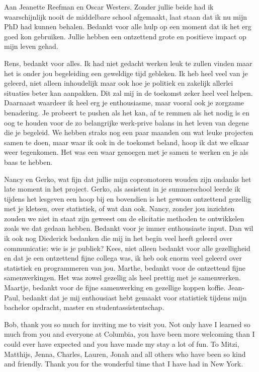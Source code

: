 \documentclass[openright,titlepage,12pt,a4paper]{book}
\begin{document}
Aan Jeanette Reefman en Oscar Westers. Zonder jullie beide had ik waarschijnlijk nooit de middelbare school afgemaakt, laat staan dat ik nu mijn PhD had kunnen behalen. Bedankt voor alle hulp op een moment dat ik het erg goed kon gebruiken. Jullie hebben een ontzettend grote en positieve impact op mijn leven gehad.

Rens, bedankt voor alles. Ik had niet gedacht werken leuk te zullen vinden maar het is onder jou begeleiding een geweldige tijd gebleken. Ik heb heel veel van je geleerd, niet alleen inhoudelijk maar ook hoe je politiek en zakelijk allerlei situaties beter kan aanpakken. Dit zal mij in de toekomst zeker heel veel helpen. Daarnaast waardeer ik heel erg je enthousiasme, maar vooral ook je zorgzame benadering. Je probeert te pushen als het kan, af te remmen als het nodig is en oog te houden voor de zo belangrijke werk-prive balans in het leven van degene die je begeleid. We hebben straks nog een paar maanden om wat leuke projecten samen te doen, maar waar ik ook in de toekomst beland, hoop ik dat we elkaar weer tegenkomen. Het was een waar genoegen met je samen te werken en je als baas te hebben.

Nancy en Gerko, wat fijn dat jullie mijn copromotoren wouden zijn ondanks het late moment in het project. Gerko, als assistent in je summerschool leerde ik tijdens het lesgeven een hoop bij en bovendien is het gewoon ontzettend gezellig met je kletsen, over statistiek, of wat dan ook. Nancy, zonder jou inzichten zouden we niet in staat zijn geweest om de elicitatie methoden te ontwikkelen zoals we dat gedaan hebben. Bedankt voor je immer enthousiaste input. Dan wil ik ook nog Diederick bedanken die mij in het begin veel heeft geleerd over communicatie: wie is je publiek? Kees, niet alleen bedankt voor alle gezelligheid en dat je een ontzettend fijne collega was, ik heb ook enorm veel geleerd over statistiek en programmeren van jou. Marthe, bedankt voor de ontzettend fijne samenwerkingen. Het was zowel gezellig als heel prettig met je samenwerken. Maartje, bedankt voor de fijne samenwerking en gezellige koppen koffie. Jean-Paul, bedankt dat je mij enthousiast hebt gemaakt voor statistiek tijdens mijn bachelor opdracht, master en studentassistentschap.

\newpage

Bob, thank you so much for inviting me to visit you. Not only have I learned so much from you and everyone at Columbia, you have been more welcoming than I could ever have expected and you have made my stay a lot of fun. To Mitzi, Matthijs, Jenna, Charles, Lauren, Jonah and all others who have been so kind and friendly. Thank you for the wonderful time that I have had in New York.
\end{document}
